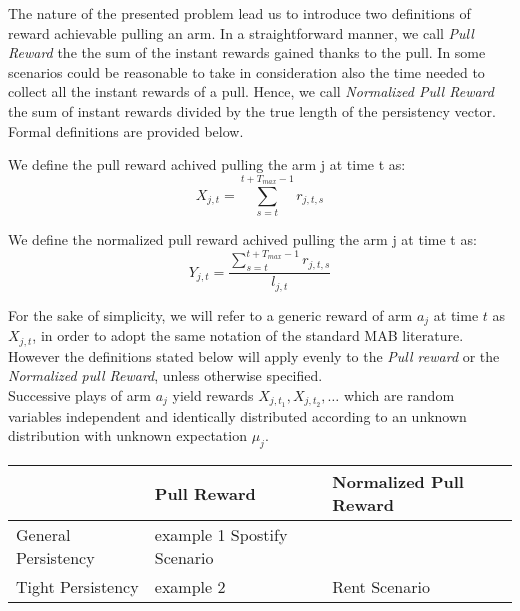 The nature of the presented problem lead us to introduce two definitions of reward achievable pulling an arm. In a straightforward manner, we call \emph{Pull Reward} the the sum of the instant rewards gained thanks to the pull. In some scenarios could be reasonable to take in consideration also the time needed to collect all the instant rewards of a pull. Hence, we call \emph{Normalized Pull Reward} the sum of instant rewards divided by the true length of the persistency vector. Formal definitions are provided below.


\begin{definition}
	We define the pull reward achived pulling the arm j at time t as:
		$$X_{j,t} = \sum_{s=t}^{t+T_{max}-1} r_{j,t,s}$$
\end{definition}

\begin{definition}
	We define the normalized pull reward achived pulling the arm j at time t as:
		$$Y_{j,t} = \dfrac{\sum_{s=t}^{t+T_{max}-1} r_{j,t,s}}{l_{j,t}}$$
\end{definition}

For the sake of simplicity, we will refer to a generic reward of arm $a_j$ at time $t$ as $X_{j,t}$, in order to adopt the same notation of the standard MAB literature. However the definitions stated below will apply evenly to the \emph{Pull reward} or the \emph{Normalized pull Reward}, unless otherwise specified.\\
Successive plays of arm $a_j$ yield rewards $X_{j,t_1}, X_{j,t_2},\dots$ which are random variables independent and identically distributed according to an unknown distribution with unknown expectation $\mu_j$.\\ 
\begin{center}
	\begin{tabularx}{0.8\textwidth} { 
			| >{\raggedright\arraybackslash}X 
			| >{\centering\arraybackslash}X 
			| >{\raggedleft\arraybackslash}X | }
		\hline
		  & Pull Reward & Normalized Pull Reward \\
		\hline
		General Persistency  & example 1 Spostify Scenario  &   \\
		\hline
		Tight Persistency  & example 2  & Rent Scenario  \\
		\hline
	\end{tabularx}
\end{center}



